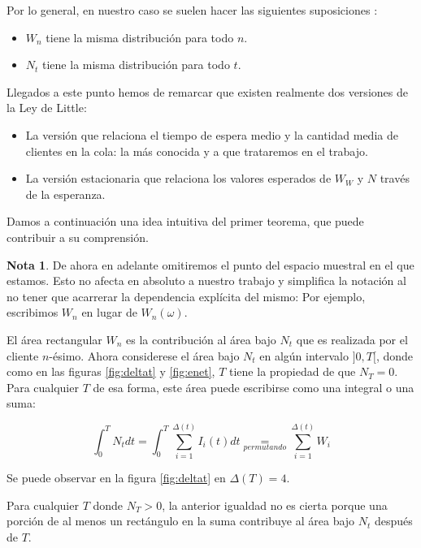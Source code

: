 \documentclass[a4paper,10pt]{scrartcl}
\theoremstyle{definition}
\newtheorem*{rmk*}{Nota}
\theoremstyle{definition}
\newtheorem*{rmk*}{Nota}
\numberwithin{equation}{section}
\begin{document}
	Por lo general, en nuestro caso se suelen hacer las siguientes suposiciones :
	\begin{itemize}
		\item $W_n$ tiene la misma distribución para todo $n$.
		\item $N_t$ tiene la misma distribución para todo $t$.
	\end{itemize} 
	
	Llegados a este punto hemos de remarcar que existen realmente dos versiones de la Ley de Little: 
	
	\begin{itemize}
		\item La versión que relaciona el tiempo de espera medio y la cantidad media de clientes en la cola: 
		la más conocida y a que trataremos en el trabajo.
		\item La versión estacionaria que relaciona los valores esperados de $W_W$ y $N$ través de la esperanza. 
	\end{itemize}
	
	Damos a continuación una idea intuitiva del primer teorema, que puede contribuir a su comprensión.
	
	\begin{rmk*}
		De ahora en adelante omitiremos el punto del espacio muestral en el que estamos. Esto no afecta 
		en absoluto a nuestro trabajo y simplifica la notación al no tener que acarrerar la dependencia 
		explícita del mismo: Por ejemplo, escribimos $W_n$ en lugar de $W_n(\omega)$. 
	\end{rmk*}
	
	El área rectangular $W_n$ es la contribución al área bajo $N_t$ que es realizada por el cliente $n$-ésimo. 
	Ahora considerese el área bajo $N_t$ en algún intervalo $]0,T[$, donde como en las figuras \ref{fig:deltat}
	y \ref{fig:enet}, $T$ tiene la propiedad de que $N_T = 0$. Para cualquier $T$ de esa forma, este área puede 
	escribirse como una integral o una suma:
	
	\[\int_{0}^{T} N_t dt=\int_{0}^{T} \sum_{i=1}^{\Delta (t)} I_i(t) dt \underset{permutando}{=}\sum_{i=1}^{\Delta (t)} W_i\]
	
	Se puede observar en la figura \ref{fig:deltat} en $\Delta(T) = 4$.
	
	Para cualquier $T$ donde $N_T > 0$, la anterior igualdad no es cierta porque una porción de al menos un 
	rectángulo en la suma contribuye al área bajo $N_t$ después de $T$. 
	
\end{document}
